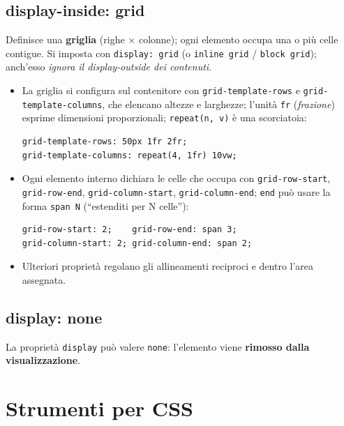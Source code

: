 \subsection{display-inside: grid}
Definisce una \textbf{griglia} (righe $\times$ colonne); ogni elemento occupa una o pi\`u
celle contigue. Si imposta con \texttt{display: grid} (o \texttt{inline grid} /
\texttt{block grid}); anch'esso \emph{ignora il display-outside dei contenuti}.
\begin{itemize}
  \item La griglia si configura sul contenitore con \texttt{grid-template-rows} e
        \texttt{grid-template-columns}, che elencano altezze e larghezze; l'unit\`a
        \texttt{fr} (\emph{frazione}) esprime dimensioni proporzionali; \texttt{repeat(n, v)}
        \`e una scorciatoia:
\begin{lstlisting}[language=HTMLCSS]
grid-template-rows: 50px 1fr 2fr;
grid-template-columns: repeat(4, 1fr) 10vw;
\end{lstlisting}
  \item Ogni elemento interno dichiara le celle che occupa con
        \texttt{grid-row-start}, \texttt{grid-row-end}, \texttt{grid-column-start},
        \texttt{grid-column-end}; \texttt{end} pu\`o usare la forma \texttt{span N}
        (``estenditi per N celle''):
\begin{lstlisting}[language=HTMLCSS]
grid-row-start: 2;    grid-row-end: span 3;
grid-column-start: 2; grid-column-end: span 2;
\end{lstlisting}
  \item Ulteriori propriet\`a regolano gli allineamenti reciproci e dentro l'area assegnata.
\end{itemize}

\subsection{display: none}
La propriet\`a \texttt{display} pu\`o valere \texttt{none}: l'elemento viene
\textbf{rimosso dalla visualizzazione}.

\section{Strumenti per CSS}

